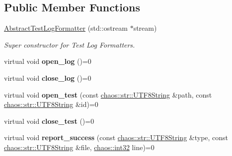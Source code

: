 \subsection*{Public Member Functions}
\begin{DoxyCompactItemize}
\item 
\hyperlink{classchaos_1_1test_1_1log__formatter_1_1_abstract_test_log_formatter_a9b6256dad677274ae028f14a3f713ca0}{Abstract\+Test\+Log\+Formatter} (std\+::ostream $\ast$stream)
\begin{DoxyCompactList}\small\item\em Super constructor for Test Log Formatters. \end{DoxyCompactList}\item 
\hypertarget{classchaos_1_1test_1_1log__formatter_1_1_abstract_test_log_formatter_ae60e3b695f6c2a7e26944c1b0b644136}{}virtual void {\bfseries open\+\_\+log} ()=0\label{classchaos_1_1test_1_1log__formatter_1_1_abstract_test_log_formatter_ae60e3b695f6c2a7e26944c1b0b644136}

\item 
\hypertarget{classchaos_1_1test_1_1log__formatter_1_1_abstract_test_log_formatter_a2884dd5deee2b1f29b971493fdc3bca3}{}virtual void {\bfseries close\+\_\+log} ()=0\label{classchaos_1_1test_1_1log__formatter_1_1_abstract_test_log_formatter_a2884dd5deee2b1f29b971493fdc3bca3}

\item 
\hypertarget{classchaos_1_1test_1_1log__formatter_1_1_abstract_test_log_formatter_a506782a79c28119c9286bcbe6d0df855}{}virtual void {\bfseries open\+\_\+test} (const \hyperlink{classchaos_1_1str_1_1_u_t_f8_string}{chaos\+::str\+::\+U\+T\+F8\+String} \&path, const \hyperlink{classchaos_1_1str_1_1_u_t_f8_string}{chaos\+::str\+::\+U\+T\+F8\+String} \&id)=0\label{classchaos_1_1test_1_1log__formatter_1_1_abstract_test_log_formatter_a506782a79c28119c9286bcbe6d0df855}

\item 
\hypertarget{classchaos_1_1test_1_1log__formatter_1_1_abstract_test_log_formatter_ae88303d5d75855ed7f65fd4e73387704}{}virtual void {\bfseries close\+\_\+test} ()=0\label{classchaos_1_1test_1_1log__formatter_1_1_abstract_test_log_formatter_ae88303d5d75855ed7f65fd4e73387704}

\item 
\hypertarget{classchaos_1_1test_1_1log__formatter_1_1_abstract_test_log_formatter_a76ba5726735b784d05e2d70218270901}{}virtual void {\bfseries report\+\_\+success} (const \hyperlink{classchaos_1_1str_1_1_u_t_f8_string}{chaos\+::str\+::\+U\+T\+F8\+String} \&type, const \hyperlink{classchaos_1_1str_1_1_u_t_f8_string}{chaos\+::str\+::\+U\+T\+F8\+String} \&file, \hyperlink{namespacechaos_ad1de7efb430365afd2c9446a0f522a90}{chaos\+::int32} line)=0\label{classchaos_1_1test_1_1log__formatter_1_1_abstract_test_log_formatter_a76ba5726735b784d05e2d70218270901}


\end{DoxyCompactItemize}
